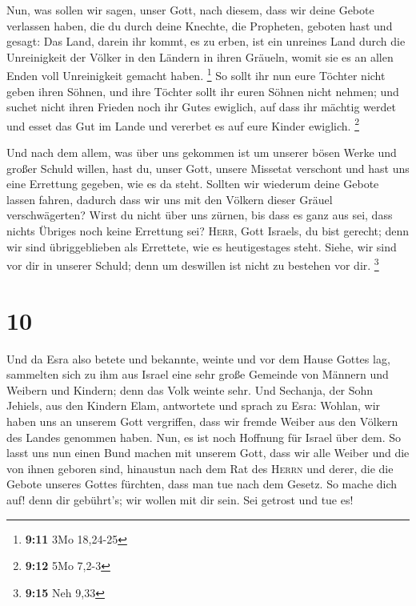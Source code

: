  Nun, was sollen wir sagen, unser Gott, nach diesem, dass
wir deine Gebote verlassen haben,  die du durch deine
Knechte, die Propheten, geboten hast und gesagt: Das Land, darein ihr
kommt, es zu erben, ist ein unreines Land durch die Unreinigkeit der
Völker in den Ländern in ihren Gräueln, womit sie es an allen Enden voll
Unreinigkeit gemacht haben. \footnote{\textbf{9:11} 3Mo 18,24-25}
 So sollt ihr nun eure Töchter nicht geben ihren Söhnen,
und ihre Töchter sollt ihr euren Söhnen nicht nehmen; und suchet nicht
ihren Frieden noch ihr Gutes ewiglich, auf dass ihr mächtig werdet und
esset das Gut im Lande und vererbet es auf eure Kinder ewiglich.
\footnote{\textbf{9:12} 5Mo 7,2-3}

 Und nach dem allem, was über uns gekommen ist um unserer
bösen Werke und großer Schuld willen, hast du, unser Gott, unsere
Missetat verschont und hast uns eine Errettung gegeben, wie es da steht.
 Sollten wir wiederum deine Gebote lassen fahren, dadurch
dass wir uns mit den Völkern dieser Gräuel verschwägerten? Wirst du
nicht über uns zürnen, bis dass es ganz aus sei, dass nichts Übriges
noch keine Errettung sei?  \textsc{Herr}, Gott Israels,
du bist gerecht; denn wir sind übriggeblieben als Errettete, wie es
heutigestages steht. Siehe, wir sind vor dir in unserer Schuld; denn um
deswillen ist nicht zu bestehen vor dir. \footnote{\textbf{9:15} Neh
  9,33}

\hypertarget{section-3}{%
\section{10}\label{section-3}}

 Und da Esra also betete und bekannte, weinte und vor dem
Hause Gottes lag, sammelten sich zu ihm aus Israel eine sehr große
Gemeinde von Männern und Weibern und Kindern; denn das Volk weinte sehr.
 Und Sechanja, der Sohn Jehiels, aus den Kindern Elam,
antwortete und sprach zu Esra: Wohlan, wir haben uns an unserem Gott
vergriffen, dass wir fremde Weiber aus den Völkern des Landes genommen
haben. Nun, es ist noch Hoffnung für Israel über dem.  So
lasst uns nun einen Bund machen mit unserem Gott, dass wir alle Weiber
und die von ihnen geboren sind, hinaustun nach dem Rat des
\textsc{Herrn} und derer, die die Gebote unseres Gottes fürchten, dass
man tue nach dem Gesetz.  So mache dich auf! denn dir
gebührt's; wir wollen mit dir sein. Sei getrost und tue es!

